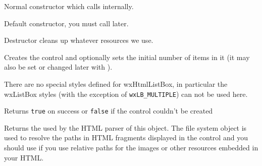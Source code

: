 

\label{wxhtmllistboxwxhtmllistbox}


Normal constructor which calls 
internally.


Default constructor, you must call 
later.


\label{wxhtmllistboxdtor}


Destructor cleans up whatever resources we use.


\label{wxhtmllistboxcreate}


Creates the control and optionally sets the initial number of items in it
(it may also be set or changed later with
).

There are no special styles defined for wxHtmlListBox, in particular the
wxListBox styles (with the exception of {\tt wxLB_MULTIPLE}) can not be used here.

Returns {\tt true} on success or {\tt false} if the control couldn't be created


\label{wxhtmllistboxgetfilesystem}



Returns the  used by the HTML parser of
this object. The file system object is used to resolve the paths in HTML
fragments displayed in the control and you should use
 if you use
relative paths for the images or other resources embedded in your HTML.


